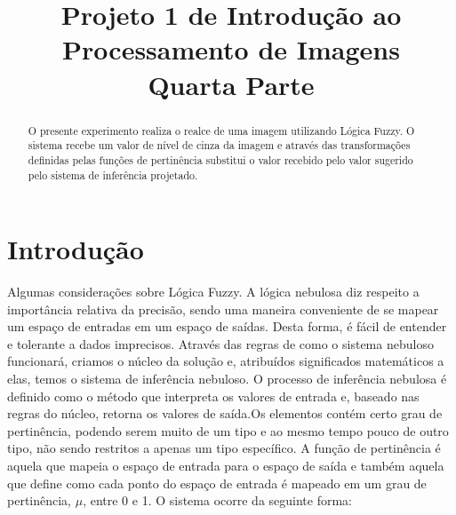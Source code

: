 \documentclass[conference]{IEEEtran}
\begin{document}
\title{Projeto 1 de Introdu\c{c}\~ao ao Processamento de Imagens \\ Quarta Parte}
\author{
}
\maketitle
\begin{abstract}
O presente experimento realiza o realce de uma imagem utilizando L\'ogica Fuzzy. O sistema recebe um valor de n\'ivel de cinza da imagem e atrav\'es das transforma\c{c}\~oes definidas pelas fun\c{c}\~oes de pertin\^encia substitui o valor recebido pelo valor sugerido pelo sistema de infer\^encia projetado. 
\end{abstract}

\section{ Introdu\c{c}\~ao} 
\label{sec:meth} 
Algumas considera\c{c}\~oes sobre  L\'ogica Fuzzy. A l\'ogica nebulosa diz respeito a import\^ancia relativa da precis\~ao, sendo uma maneira conveniente de se mapear um espa\c{c}o de entradas em um espa\c{c}o de sa\'idas. Desta forma, \'e f\'acil de entender e tolerante a dados imprecisos. Atrav\'es das regras de como o sistema nebuloso funcionar\'a, criamos o n\'ucleo da solu\c{c}\~ao e, atribu\'idos significados matem\'aticos a elas, temos o sistema de infer\^encia nebuloso. O processo de infer\^encia nebulosa \'e definido como o m\'etodo que interpreta os valores de entrada e, baseado nas regras do n\'ucleo, retorna os valores de sa\'ida.Os elementos cont\'em certo grau de pertin\^encia, podendo serem muito de um tipo e ao mesmo tempo pouco de outro tipo, n\~ao sendo restritos a apenas um tipo espec\'ifico. A fun\c{c}\~ao de pertin\^encia \'e aquela que mapeia o espa\c{c}o de entrada para o espa\c{c}o de sa\'ida e tamb\'em aquela que define como cada ponto do espa\c{c}o de entrada \'e mapeado em um grau de pertin\^encia, $\mu$, entre 0 e 1. O sistema ocorre da seguinte forma:
\end{document}
